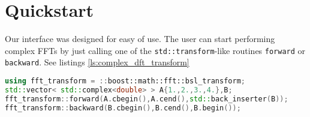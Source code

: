 \section{Quickstart}

Our interface was designed for easy of use. The user can start performing
complex FFTs by just calling one of the \texttt{std::transform}-like routines
\texttt{forward} or \texttt{backward}. See listings
\ref{ls:complex_dft_transform}

\begin{lstlisting}[language=C++,label=ls:complex_dft_transform,caption=Simple complex FFT
transform.]
using fft_transform = ::boost::math::fft::bsl_transform;
std::vector< std::complex<double> > A{1.,2.,3.,4.},B;
fft_transform::forward(A.cbegin(),A.cend(),std::back_inserter(B));
fft_transform::backward(B.cbegin(),B.cend(),B.begin());
\end{lstlisting}


